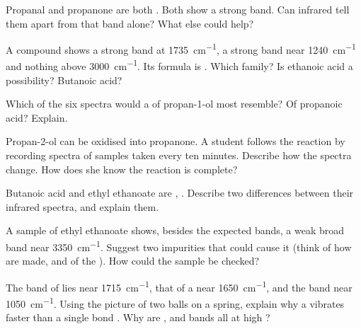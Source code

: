 \begin{exercise}[$\star\star$]\label{exo:g11:infrared:9}
Propanal and propanone are both . Both show a strong 
band. Can infrared tell them apart from that band alone? What else could
help?
\end{exercise}

\begin{exercise}[$\star\star$]\label{exo:g11:infrared:10}
A compound shows a strong band at \qty{1735}{cm^{-1}}, a strong band near
\qty{1240}{cm^{-1}} and nothing above \qty{3000}{cm^{-1}}. Its formula is
. Which family? Is ethanoic acid a possibility? Butanoic
acid?
\end{exercise}

\begin{exercise}[$\star\star$]\label{exo:g11:infrared:11}
Which of the six spectra would a  of propan-1-ol most resemble?
Of propanoic acid? Explain.
\end{exercise}

\begin{exercise}[$\star\star\star$]\label{exo:g11:infrared:12}
Propan-2-ol can be oxidised into propanone. A student follows the
reaction by recording spectra of samples taken every ten minutes.
Describe how the spectra change. How does she know the reaction is
complete?
\end{exercise}

\begin{exercise}[$\star\star\star$]\label{exo:g11:infrared:13}
Butanoic acid and ethyl ethanoate are , . Describe two
differences between their infrared spectra, and explain them.
\end{exercise}

\begin{exercise}[$\star\star\star$]\label{exo:g11:infrared:14}
A sample of ethyl ethanoate shows, besides the expected bands, a weak
broad band near \qty{3350}{cm^{-1}}. Suggest two impurities that could
cause it (think of how  are made, and of the ). How could the
sample be checked?
\end{exercise}

\begin{exercise}[$\star\star\star$]\label{exo:g11:infrared:15}
The  band of  lies near \qty{1715}{cm^{-1}}, that of a
 near \qty{1650}{cm^{-1}}, and the  band near
\qty{1050}{cm^{-1}}. Using the picture of two balls on a spring, explain
why a   vibrates faster than a single bond .
Why are ,  and  bands all at high ?
\end{exercise}

